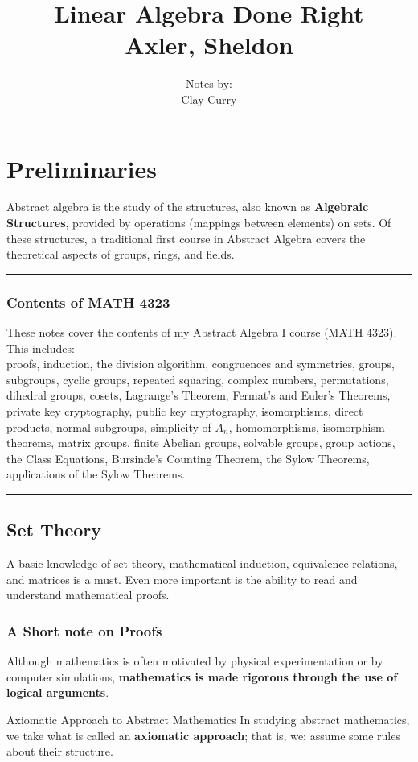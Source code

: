 \documentclass[11pt]{article} %
\title{Linear Algebra Done Right \\ Axler, Sheldon}
\author{Notes by:  \\ Clay Curry}
\date{}
\renewcommand\S{\mathcal{S}}
\begin{document}
\section{Preliminaries}

Abstract algebra is the study of the structures, also known as \textbf{Algebraic Structures}, provided by operations (mappings between elements) on sets. Of these structures, a traditional first course in Abstract Algebra covers the theoretical aspects of groups, rings, and fields. 

\noindent\rule{\textwidth}{1pt}

\subsubsection{Contents of MATH 4323}
These notes cover the contents of my Abstract Algebra I course (MATH 4323). This includes:\\
proofs, induction,  the division algorithm, congruences and symmetries, groups, subgroups, cyclic groups, repeated squaring, complex numbers, permutations, dihedral groups, cosets, Lagrange's Theorem, Fermat's and Euler's Theorems, private key cryptography, public key cryptography, isomorphisms, direct products, normal subgroups, simplicity of $A_n$, homomorphisms, isomorphism theorems, matrix groups, finite Abelian groups, solvable groups, group actions, the Class Equations, Bursinde's Counting Theorem, the Sylow Theorems, applications of the Sylow Theorems.

\noindent\rule{\textwidth}{1pt}

\subsection{Set Theory}
A basic knowledge of set theory, mathematical induction, equivalence relations, and matrices is a must. Even more important is the ability to read and understand mathematical proofs.

\subsubsection{A Short note on Proofs}

Although mathematics is often motivated by physical experimentation or by computer simulations, \textbf{mathematics is made rigorous through the use of logical arguments}.

{Axiomatic Approach to Abstract Mathematics}
{
In studying abstract mathematics, we take what is called an \textbf{axiomatic approach}; that is, we: 
\points{take a collection of objects $\S$, and} 
{assume some rules about their structure.} 
}
\end{document}
